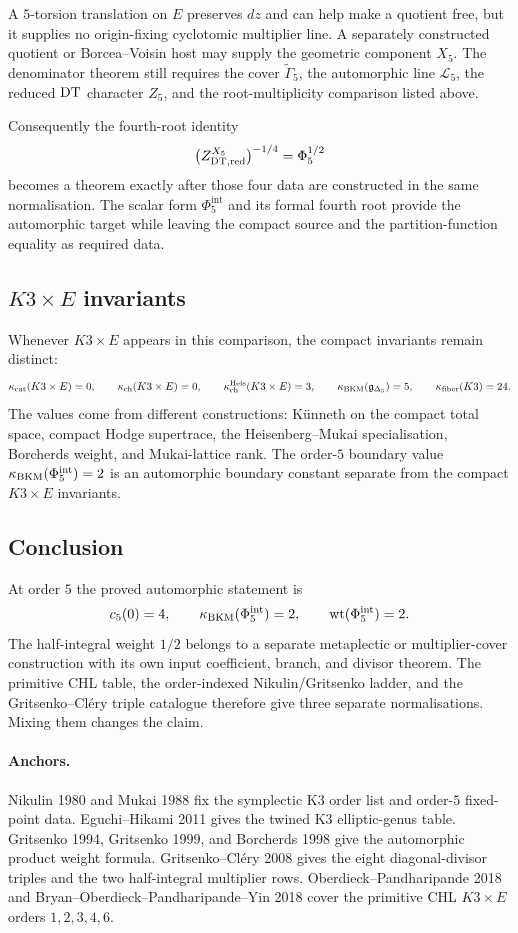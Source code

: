 A \(5\)-torsion translation on \(E\) preserves \(dz\) and can help make a
quotient free, but it supplies no origin-fixing cyclotomic multiplier
line.  A separately constructed quotient or Borcea--Voisin host may
supply the geometric component \(X_5\).  The denominator theorem still
requires the cover \(\widetilde{\Gamma}_5\), the automorphic line
\(\mathcal L_5\), the reduced \(\mathrm{DT}\) character \(Z_5\), and the
root-multiplicity comparison listed above.

Consequently the fourth-root identity
\[
  \bigl(Z^{X_5}_{\mathrm{DT},\mathrm{red}}\bigr)^{-1/4}=\Phi_5^{1/2}
\]
becomes a theorem exactly after those four data are constructed in the
same normalisation.  The scalar form \(\Phi_5^{\mathrm{int}}\) and its
formal fourth root provide the automorphic target while leaving the
compact source and the partition-function equality as required data.

\subsection*{\(K3\times E\) invariants}

Whenever \(K3\times E\) appears in this comparison, the compact
invariants remain distinct:
\[
  \kappa_{\mathrm{cat}}(K3\times E)=0,\qquad
  \kappa_{\mathrm{ch}}(K3\times E)=0,\qquad
  \kappa_{\mathrm{ch}}^{\mathrm{Heis}}(K3\times E)=3,\qquad
  \kappa_{\mathrm{BKM}}(\mathfrak g_{\Delta_5})=5,\qquad
  \kappa_{\mathrm{fiber}}(K3)=24.
\]
The values come from different constructions: K\"unneth on the compact
total space, compact Hodge supertrace, the Heisenberg--Mukai
specialisation, Borcherds weight, and Mukai-lattice rank.  The
order-$5$ boundary value \(\kappa_{\mathrm{BKM}}(\Phi_5^{\mathrm{int}})=2\) is an
automorphic boundary constant separate from the compact \(K3\times E\)
invariants.

\subsection*{Conclusion}

At order \(5\) the proved automorphic statement is
\[
  c_5(0)=4,\qquad
  \kappa_{\mathrm{BKM}}(\Phi_5^{\mathrm{int}})=2,\qquad
  \operatorname{wt}(\Phi_5^{\mathrm{int}})=2.
\]
The half-integral weight \(1/2\) belongs to a separate metaplectic or
multiplier-cover construction with its own input coefficient, branch,
and divisor theorem.  The primitive CHL table, the order-indexed
Nikulin/Gritsenko ladder, and the Gritsenko--Cl\'ery triple catalogue
therefore give three separate normalisations.  Mixing them changes the
claim.

\paragraph{Anchors.}
Nikulin 1980 and Mukai 1988 fix the symplectic K3 order list and
order-$5$ fixed-point data.  Eguchi--Hikami 2011 gives the twined K3
elliptic-genus table.  Gritsenko 1994, Gritsenko 1999, and Borcherds
1998 give the automorphic product weight formula.  Gritsenko--Cl\'ery
2008 gives the eight diagonal-divisor triples and the two
half-integral multiplier rows.  Oberdieck--Pandharipande 2018 and
Bryan--Oberdieck--Pandharipande--Yin 2018 cover the primitive CHL
\(K3\times E\) orders \(1,2,3,4,6\).
